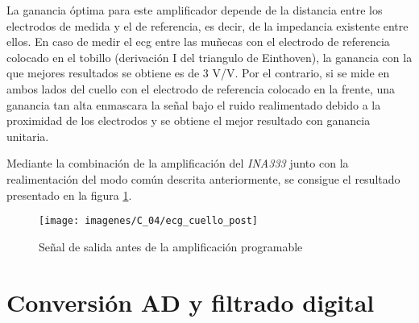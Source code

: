 La ganancia óptima para este amplificador depende de la distancia entre los electrodos de medida y el de referencia, es decir, de la impedancia existente entre ellos. En caso de medir el \acrshort{ecg} entre las muñecas con el electrodo de referencia colocado en el tobillo (derivación I del triangulo de Einthoven), la ganancia con la que mejores resultados se obtiene es de 3 V/V. Por el contrario, si se mide en ambos lados del cuello con el electrodo de referencia colocado en la frente, una ganancia tan alta enmascara la señal bajo el ruido realimentado debido a la proximidad de los electrodos y se obtiene el mejor resultado con ganancia unitaria.

Mediante la combinación de la amplificación del \textit{INA333} junto con la realimentación del modo común descrita anteriormente, se consigue el resultado presentado en la figura \ref{fig:signal_post}.

\begin{figure}[!ht]
	\center
	\texttt{[image: imagenes/C\_04/ecg\_cuello\_post]}
	\caption{Señal de salida antes de la amplificación programable}
	\label{fig:signal_post}
\end{figure}










\section{Conversión AD y filtrado digital}\label{sec:ADC}
%

